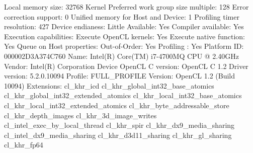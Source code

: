 \begin{codebox}[text]
  Local memory size:                             32768
  Kernel Preferred work group size multiple:     128
  Error correction support:                      0
  Unified memory for Host and Device:            1
  Profiling timer resolution:                    427
  Device endianess:                              Little
  Available:                                     Yes
  Compiler available:                            Yes
  Execution capabilities:
    Execute OpenCL kernels:                      Yes
    Execute native function:                     Yes
  Queue on Host properties:
    Out-of-Order:                                Yes
    Profiling :                                  Yes
  Platform ID:                                   000002D3A374C760
  Name:                                          Intel(R) Core(TM) i7-4700MQ CPU @ 2.40GHz
  Vendor:                                        Intel(R) Corporation
  Device OpenCL C version:                       OpenCL C 1.2
  Driver version:                                5.2.0.10094
  Profile:                                       FULL_PROFILE
  Version:                                       OpenCL 1.2 (Build 10094)
  Extensions:
   cl_khr_icd
   cl_khr_global_int32_base_atomics
   cl_khr_global_int32_extended_atomics
   cl_khr_local_int32_base_atomics
   cl_khr_local_int32_extended_atomics
   cl_khr_byte_addressable_store
   cl_khr_depth_images
   cl_khr_3d_image_writes
   cl_intel_exec_by_local_thread
   cl_khr_spir
   cl_khr_dx9_media_sharing
   cl_intel_dx9_media_sharing
   cl_khr_d3d11_sharing
   cl_khr_gl_sharing
   cl_khr_fp64


\end{codebox}

